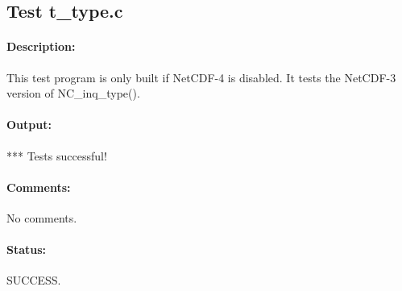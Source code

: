 \subsection{Test t\_type.c}

\paragraph{Description:} This test program is only built if NetCDF-4 is disabled. It tests the NetCDF-3 version of NC\_inq\_type().

\paragraph{Output:} *** Tests successful!

\paragraph{Comments:} No comments.

\paragraph{Status:} SUCCESS.
